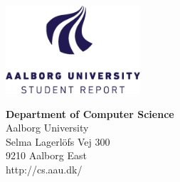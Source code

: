 
\thispagestyle{empty}
{}
\begin{minipage}[t]{0.48\textwidth}
\vspace*{-36pt}			%
\includegraphics[width = 5cm]{formalities/aau_logo_en.png} 
\end{minipage}
\hfill
\begin{minipage}[t]{0.48\textwidth}
{\small 
\textbf{Department of Computer Science}  \\
Aalborg University \\
Selma Lagerlöfs Vej 300 \\
9210 Aalborg East\\
http://cs.aau.dk/}
\end{minipage}

\vspace*{1cm}

